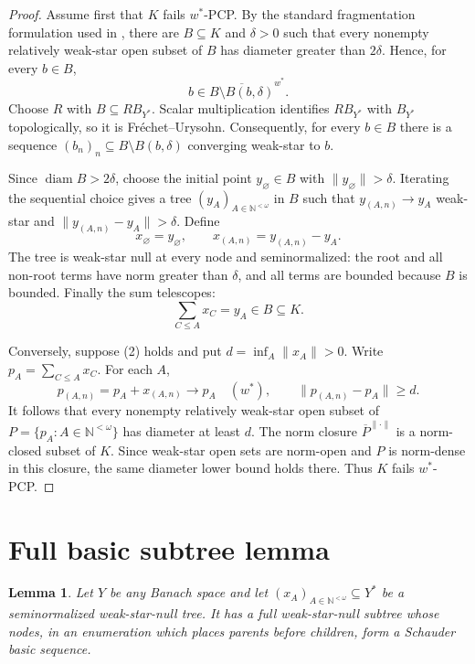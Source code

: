 \documentclass[11pt]{article}
\newtheorem{lemma}[theorem]{Lemma}
\newcommand{\N}{\mathbb N}
\begin{document}
\begin{proof}
Assume first that $K$ fails $w^*$-PCP.  By the standard fragmentation
formulation used in \cite[Proposition 2]{LPS}, there are $B\subseteq K$ and
$\delta>0$ such that every nonempty relatively weak-star open subset of $B$
has diameter greater than $2\delta$.  Hence, for every $b\in B$,
\[
b\in\overline{B\setminus B(b,\delta)}^{w^*}.
\]
Choose $R$ with $B\subseteq R B_{Y^*}$.  Scalar multiplication identifies
$R B_{Y^*}$ with $B_{Y^*}$ topologically, so it is Fr\'echet--Urysohn.
Consequently, for every $b\in B$ there is a sequence
$(b_n)_n\subseteq B\setminus B(b,\delta)$ converging weak-star to $b$.

Since $\operatorname{diam}B>2\delta$, choose the initial point
$y_\varnothing\in B$ with $\|y_\varnothing\|>\delta$.  Iterating the
sequential choice gives a tree $(y_A)_{A\in\N^{<\omega}}$ in $B$ such
that $y_{(A,n)}\to y_A$ weak-star and
$\|y_{(A,n)}-y_A\|>\delta$.  Define
\[
x_\varnothing=y_\varnothing,
\qquad
x_{(A,n)}=y_{(A,n)}-y_A.
\]
The tree is weak-star null at every node and seminormalized: the root and all
non-root terms have norm greater than $\delta$, and all terms are bounded
because $B$ is bounded.  Finally the sum telescopes:
\[
\sum_{C\leq A}x_C=y_A\in B\subseteq K.
\]

Conversely, suppose (2) holds and put
$d=\inf_A\|x_A\|>0$.  Write $p_A=\sum_{C\leq A}x_C$.  For each $A$,
\[
p_{(A,n)}=p_A+x_{(A,n)}\longrightarrow p_A\quad(w^*),
\qquad
\|p_{(A,n)}-p_A\|\geq d.
\]
It follows that every nonempty relatively weak-star open subset of
$P=\{p_A:A\in\N^{<\omega}\}$ has diameter at least $d$.  The norm closure
$\overline{P}^{\|\cdot\|}$ is a norm-closed subset of $K$.  Since weak-star open sets
are norm-open and $P$ is norm-dense in this closure, the same diameter lower
bound holds there.  Thus $K$ fails $w^*$-PCP.
\end{proof}

\section*{Full basic subtree lemma}

\begin{lemma}\label{lem:basic}
Let $Y$ be any Banach space and let
$(x_A)_{A\in\N^{<\omega}}\subseteq Y^*$ be a seminormalized weak-star-null
tree.  It has a full weak-star-null subtree whose nodes, in an enumeration
which places parents before children, form a Schauder basic sequence.
\end{lemma}
\end{document}

